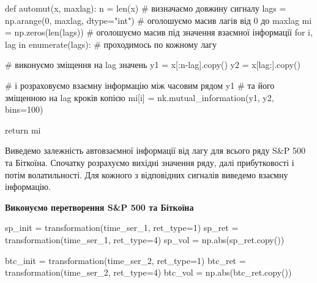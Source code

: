 \documentclass[
  letterpaper,
]{report}
\newenvironment{Shaded}{\begin{snugshade}}{\end{snugshade}}
\newcommand{\BuiltInTok}[1]{\textcolor[rgb]{0.00,0.23,0.31}{#1}}
\newcommand{\CommentTok}[1]{\textcolor[rgb]{0.37,0.37,0.37}{#1}}
\newcommand{\ControlFlowTok}[1]{\textcolor[rgb]{0.00,0.23,0.31}{#1}}
\newcommand{\DecValTok}[1]{\textcolor[rgb]{0.68,0.00,0.00}{#1}}
\newcommand{\KeywordTok}[1]{\textcolor[rgb]{0.00,0.23,0.31}{#1}}
\newcommand{\NormalTok}[1]{\textcolor[rgb]{0.00,0.23,0.31}{#1}}
\newcommand{\OperatorTok}[1]{\textcolor[rgb]{0.37,0.37,0.37}{#1}}
\newcommand{\StringTok}[1]{\textcolor[rgb]{0.13,0.47,0.30}{#1}}
\begin{document}
\begin{Shaded}
\begin{Highlighting}[]
\KeywordTok{def}\NormalTok{ automut(x, maxlag):}
\NormalTok{    n }\OperatorTok{=} \BuiltInTok{len}\NormalTok{(x)                               }\CommentTok{\# визначаємо довжину сигналу}
\NormalTok{    lags }\OperatorTok{=}\NormalTok{ np.arange(}\DecValTok{0}\NormalTok{, maxlag, dtype}\OperatorTok{=}\StringTok{"int"}\NormalTok{) }\CommentTok{\# оголошуємо масив лагів від 0 до maxlag}
\NormalTok{    mi }\OperatorTok{=}\NormalTok{ np.zeros(}\BuiltInTok{len}\NormalTok{(lags))                 }\CommentTok{\# оголошуємо масив під значення взаємної інформації}
    \ControlFlowTok{for}\NormalTok{ i, lag }\KeywordTok{in} \BuiltInTok{enumerate}\NormalTok{(lags):           }\CommentTok{\# проходимось по кожному лагу}
        
        \CommentTok{\# виконуємо зміщення на lag значень }
\NormalTok{        y1 }\OperatorTok{=}\NormalTok{ x[:n}\OperatorTok{{-}}\NormalTok{lag].copy()}
\NormalTok{        y2 }\OperatorTok{=}\NormalTok{ x[lag:].copy()}

        \CommentTok{\# і розраховуємо взаємну інформацію між часовим рядом y1}
        \CommentTok{\# та його зміщенною на lag кроків копією }
\NormalTok{        mi[i] }\OperatorTok{=}\NormalTok{ nk.mutual\_information(y1, y2, bins}\OperatorTok{=}\DecValTok{100}\NormalTok{)}

    \ControlFlowTok{return}\NormalTok{ mi}
\end{Highlighting}
\end{Shaded}

Виведемо залежність автовзаємної інформації від лагу для всього ряду
S\&P 500 та Біткоїна. Спочатку розрахуємо вихідні значення ряду, далі
прибутковості і потім волатильності. Для кожного з відповідних сигналів
виведемо взаємну інформацію.

\textbf{Виконуємо перетворення S\&P 500 та Біткоїна}

\begin{Shaded}
\begin{Highlighting}[]
\NormalTok{sp\_init }\OperatorTok{=}\NormalTok{ transformation(time\_ser\_1, ret\_type}\OperatorTok{=}\DecValTok{1}\NormalTok{)}
\NormalTok{sp\_ret }\OperatorTok{=}\NormalTok{ transformation(time\_ser\_1, ret\_type}\OperatorTok{=}\DecValTok{4}\NormalTok{)}
\NormalTok{sp\_vol }\OperatorTok{=}\NormalTok{ np.}\BuiltInTok{abs}\NormalTok{(sp\_ret.copy())}

\NormalTok{btc\_init }\OperatorTok{=}\NormalTok{ transformation(time\_ser\_2, ret\_type}\OperatorTok{=}\DecValTok{1}\NormalTok{)}
\NormalTok{btc\_ret }\OperatorTok{=}\NormalTok{ transformation(time\_ser\_2, ret\_type}\OperatorTok{=}\DecValTok{4}\NormalTok{)}
\NormalTok{btc\_vol }\OperatorTok{=}\NormalTok{ np.}\BuiltInTok{abs}\NormalTok{(btc\_ret.copy())}
\end{Highlighting}
\end{Shaded}
\end{document}
